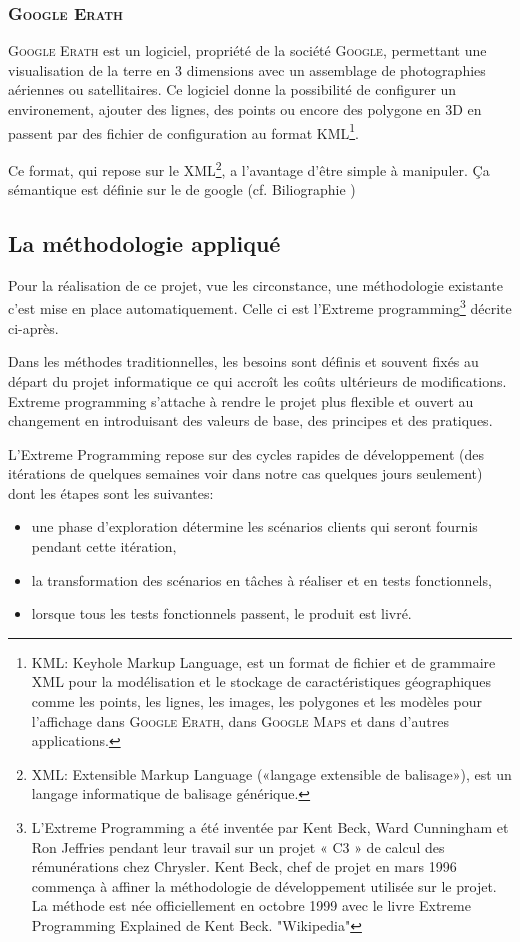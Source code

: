         \subsubsection{\textsc{Google Erath}}
\textsc{Google Erath} est un logiciel, propriété de la société \textsc{Google}, permettant une visualisation de la terre en 3 dimensions avec un assemblage de photographies aériennes ou satellitaires. Ce logiciel donne la possibilité de configurer un environement, ajouter des lignes, des points ou encore des polygone en 3D en passent par des fichier de configuration au format KML\footnote{KML: Keyhole Markup Language, est un format de fichier et de grammaire XML pour la modélisation et le stockage de caractéristiques géographiques comme les points, les lignes, les images, les polygones et les modèles pour l'affichage dans \textsc{Google Erath}, dans \textsc{Google Maps} et dans d'autres applications.}.

Ce format, qui repose sur le XML\footnote{XML: Extensible Markup Language («langage extensible de balisage»), est un langage informatique de balisage générique.}, a l'avantage d’être simple à manipuler. Ça sémantique est définie sur le de google (cf. Biliographie \cite{gecode}) 

    \subsection{La méthodologie appliqué}
Pour la réalisation de ce projet, vue les circonstance, une méthodologie existante c'est mise en place automatiquement. Celle ci est l'Extreme programming\footnote{L'Extreme Programming a été inventée par Kent Beck, Ward Cunningham et Ron Jeffries pendant leur travail sur un projet « C3 » de calcul des rémunérations chez Chrysler. Kent Beck, chef de projet en mars 1996 commença à affiner la méthodologie de développement utilisée sur le projet. La méthode est née officiellement en octobre 1999 avec le livre Extreme Programming Explained de Kent Beck. "Wikipedia"} décrite ci-après.

Dans les méthodes traditionnelles, les besoins sont définis et souvent fixés au départ du projet informatique ce qui accroît les coûts ultérieurs de modifications. Extreme programming s'attache à rendre le projet plus flexible et ouvert au changement en introduisant des valeurs de base, des principes et des pratiques.

L'Extreme Programming repose sur des cycles rapides de développement (des itérations de quelques semaines voir dans notre cas quelques jours seulement) dont les étapes sont les suivantes:
\begin{itemize}
\item une phase d'exploration détermine les scénarios clients qui seront fournis pendant cette itération,
\item la transformation des scénarios en tâches à réaliser et en tests fonctionnels,
\item lorsque tous les tests fonctionnels passent, le produit est livré.
\end{itemize}

